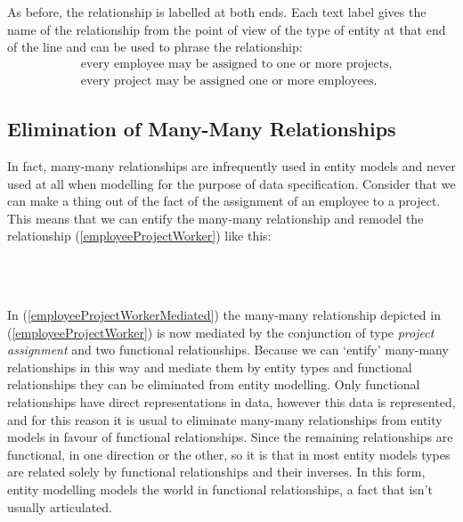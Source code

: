 \begin{gather}
\label{employeeProjectWorker}
\raisebox{-1cm}{

}
\end{gather}

\noindent As before, the relationship is labelled at both ends. Each text label gives the name of the relationship from the point of view of the type of entity at that end of the line and can be used to phrase the relationship:
\begin{align}
\label{assignedToText}&\mbox{every employee may be assigned to one or more projects,} \\
\label{assignedText}&\mbox{every project may be assigned one or more employees.}
\end{align}

\subsection*{Elimination of Many-Many Relationships}
\noindent In fact, many-many relationships are infrequently used in entity models and never used at all when modelling for the purpose of data specification.
Consider that we can make a thing out of the fact of the assignment of an employee to a project. This means that we can entify the many-many relationship and remodel the relationship (\ref{employeeProjectWorker}) like this:
\begin{gather}
\label{employeeProjectWorkerMediated}
\raisebox{-1cm}{

}
\end{gather}
\noindent
In (\ref{employeeProjectWorkerMediated}) the  many-many relationship depicted in (\ref{employeeProjectWorker}) is now mediated by the conjunction of  type
\textit{project assignment} and two functional relationships. 
Because we can `entify' many-many relationships in this way and mediate them by entity types and functional relationships they can be eliminated from entity modelling. 
Only functional relationships have direct representations in data, 
however this data is represented, and for this reason it is usual to eliminate many-many relationships from entity models in favour of functional relationships. Since the remaining relationships are functional, in one direction or the other, so it is that in most entity models types are related solely by functional relationships and their inverses. In this form, entity modelling models the world in functional relationships, a fact that isn't usually articulated.

